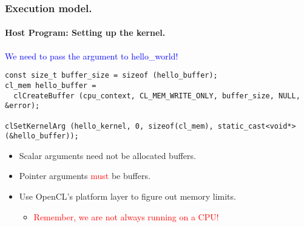 \documentclass{beamer}
\begin{document}
\begin{frame}[fragile]
\frametitle{Execution model.}
\framesubtitle{Host Program: Setting up the kernel.}

  \begin{center}
  \textcolor{blue}{We need to pass the argument to hello\_world!}
  \end{center}

  \begin{center}
  \begin{minipage}{0.75\textwidth}
  \begin{lstlisting}
const size_t buffer_size = sizeof (hello_buffer);
cl_mem hello_buffer = 
  clCreateBuffer (cpu_context, CL_MEM_WRITE_ONLY, buffer_size, NULL, &error);

clSetKernelArg (hello_kernel, 0, sizeof(cl_mem), static_cast<void*>(&hello_buffer));
  \end{lstlisting}
  \end{minipage}
  \end{center}

  \begin{itemize}
  \item Scalar arguments need not be allocated buffers.
  \item Pointer arguments \textcolor{red}{must} be buffers.
  \item Use OpenCL's platform layer to figure out memory limits.
    \begin{itemize}
    \item \textcolor{red}{Remember, we are not always running on a CPU!}
    \end{itemize}
  \end{itemize}
\end{frame}
\end{document}
